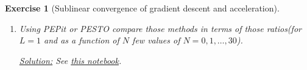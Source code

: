 \documentclass[11pt,a4paper]{article}
\newcommand{\pesto}{{PESTO }}
\newcommand{\pepit}{{PEPit }}
\newcommand{\correction}[1]{{{\color{blue}\underline{Solution:} #1}}}
\newcommand{\correction}[1]{}
\newtheorem{exercise}{Exercise}
\begin{document}
\begin{exercise}[Sublinear convergence of gradient descent and acceleration]
\begin{enumerate}
{	Then, for incorporating performance measures of type $\min_{0\leqslant i\leqslant N}\{\|\nabla f(x_i)\|^2\}$ it suffices to introduce a slack variable $t$ (which is the objective of the performance estimation problem, which is maximized) and to impose that $t\leqslant \|\nabla f(x_i)\|^2\triangleq G_{i+2,i+2}$ for $i=0,\ldots,N$. Similarly, for $\min_{0\leqslant i\leqslant N}\{f(x_i)-f_\star\}$ we introduce the slack variable $t$ (to be maximized) and impose $t\leqslant f(x_i)-f_\star\triangleq F_{i+1}$ for $i=0,\ldots,N$.
	}
	\item Using \pepit or \pesto compare those methods in terms of those ratios(for $L=1$ and as a function of $N$ few values of $N=0,1,\ldots,30$).
	
	\correction{See \href{https://github.com/PerformanceEstimation/Learning-Performance-Estimation/tree/main/Codes/Jupyter/Exercise03.ipynb}{this notebook}.}
	\end{enumerate}
	\end{exercise}	
	
\end{document}
